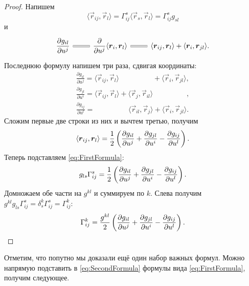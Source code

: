 \begin{proof}
	Напишем
	\begin{equation} \label{eq:FirstFormula}
		\langle\vec{r}_{ij}, \vec{r}_l\rangle = \Gamma_{ij}^s\langle\vec{r}_s, \vec{r}_l\rangle = \Gamma_{ij}^sg_{sl}
	\end{equation}
	и
	\[\begin{tikzcd}
		{\ds\frac{\partial g_{il}}{\partial u^j}} & {\ds\frac{\partial}{\partial u^j}\langle\vec{r}_i, \vec{r}_l\rangle} & {\langle\vec{r}_{ij}, \vec{r}_l\rangle + \langle\vec{r}_i, \vec{r}_{jl}\rangle.}
		\arrow[equals, from=1-1, to=1-2]
		\arrow[equals, from=1-2, to=1-3]
	\end{tikzcd}\]
	Последнюю формулу напишем три раза, сдвигая координаты:
	\begin{gather} \label{eq:SecondFormula}
		\frac{\partial g_{il}}{\partial u^j} = \langle\vec{r}_{ij}, \vec{r}_l\rangle \phantom{{} + \langle\vec{r}_j, \vec{r}_{il}\rangle} + \langle\vec{r}_i, \vec{r}_{jl}\rangle\nonumber,\\
		\frac{\partial g_{jl}}{\partial u^i} = \langle\vec{r}_{ij}, \vec{r}_l\rangle + \langle\vec{r}_j, \vec{r}_{il}\rangle \phantom{{} + \langle\vec{r}_i, \vec{r}_{jl}\rangle}\nonumber,\\
		\frac{\partial g_{ij}}{\partial u^l} = \phantom{\langle\vec{r}_{ij}, \vec{r}_l\rangle + {}} \langle\vec{r}_{il}, \vec{r}_j\rangle + \langle\vec{r}_i, \vec{r}_{jl}\rangle.
	\end{gather}
	Сложим первые две строки из них и вычтем третью, получим
	\begin{gather*}
		\langle\boldsymbol{r}_{ij}, \boldsymbol{r}_l\rangle = \frac{1}{2}\left(\frac{\partial g_{il}}{\partial u^j} + \frac{\partial g_{jl}}{\partial u^i} - \frac{\partial g_{ij}}{\partial u^l}\right).
	\end{gather*}
	Теперь подставляем \eqref{eq:FirstFormula}:
	\[
		g_{ls}\Gamma_{ij}^s = \frac{1}{2}\left(\frac{\partial g_{il}}{\partial u^j} + \frac{\partial g_{jl}}{\partial u^i} - \frac{\partial g_{ij}}{\partial u^l}\right).
	\]
	Домножаем обе части на $g^{kl}$ и суммируем по $k$. Слева получим $g^{kl}g_{ls}\Gamma^s_{ij} = \delta^k_s\Gamma^s_{ij} = \Gamma^k_{ij}$:
	\[
		\Gamma_{ij}^k = \frac{g^{kl}}{2}\left(\frac{\partial g_{il}}{\partial u^j} + \frac{\partial g_{jl}}{\partial u^i} - \frac{\partial g_{ij}}{\partial u^l}\right).
	\]
\end{proof}

Отметим, что попутно мы доказали ещё один набор важных формул. Можно напрямую подставить в \eqref{eq:SecondFormula} формулы вида \eqref{eq:FirstFormula}, получим следующее.

